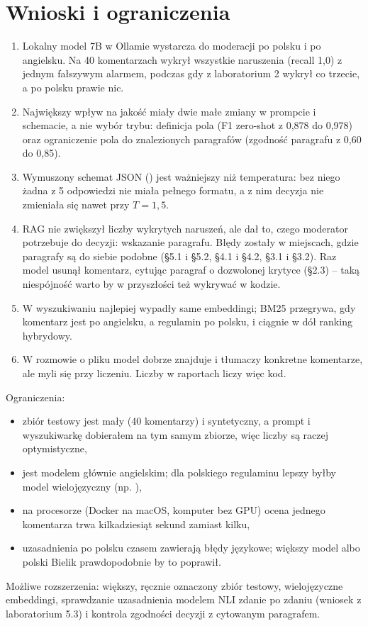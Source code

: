 \section{Wnioski i ograniczenia}

\begin{enumerate}
  \item Lokalny model 7B w Ollamie wystarcza do moderacji po polsku i po angielsku. Na 40 komentarzach wykrył
        wszystkie naruszenia (recall 1,0) z jednym fałszywym alarmem, podczas gdy  z
        laboratorium 2 wykrył co trzecie, a po polsku prawie nic.
  \item Największy wpływ na jakość miały dwie małe zmiany w prompcie i schemacie, a nie wybór trybu: definicja pola
         (F1 zero-shot z 0,878 do 0,978) oraz ograniczenie pola  do znalezionych paragrafów
        (zgodność paragrafu z 0,60 do 0,85).
  \item Wymuszony schemat JSON () jest ważniejszy niż temperatura: bez niego żadna z 5 odpowiedzi nie
        miała pełnego formatu, a z nim decyzja nie zmieniała się nawet przy $T = 1{,}5$.
  \item RAG nie zwiększył liczby wykrytych naruszeń, ale dał to, czego moderator potrzebuje do decyzji: wskazanie
        paragrafu. Błędy zostały w miejscach, gdzie paragrafy są do siebie podobne (§5.1 i §5.2, §4.1 i §4.2, §3.1
        i §3.2). Raz model usunął komentarz, cytując paragraf o dozwolonej krytyce (§2.3) -- taką niespójność warto
        by w przyszłości też wykrywać w kodzie.
  \item W wyszukiwaniu najlepiej wypadły same embeddingi; BM25 przegrywa, gdy komentarz jest po angielsku,
        a regulamin po polsku, i ciągnie w dół ranking hybrydowy.
  \item W rozmowie o pliku model dobrze znajduje i tłumaczy konkretne komentarze, ale myli się przy liczeniu.
        Liczby w raportach liczy więc kod.
\end{enumerate}

Ograniczenia:
\begin{itemize}
  \item zbiór testowy jest mały (40 komentarzy) i syntetyczny, a prompt i wyszukiwarkę dobierałem na tym samym
        zbiorze, więc liczby są raczej optymistyczne,
  \item {} jest modelem głównie angielskim; dla polskiego regulaminu lepszy byłby model
        wielojęzyczny (np. ),
  \item na procesorze (Docker na macOS, komputer bez GPU) ocena jednego komentarza trwa kilkadziesiąt sekund zamiast
        kilku,
  \item uzasadnienia po polsku czasem zawierają błędy językowe; większy model albo polski Bielik prawdopodobnie by to
        poprawił.
\end{itemize}

Możliwe rozszerzenia: większy, ręcznie oznaczony zbiór testowy, wielojęzyczne embeddingi, sprawdzanie uzasadnienia
modelem NLI zdanie po zdaniu (wniosek z laboratorium 5.3) i kontrola zgodności decyzji z cytowanym paragrafem.

